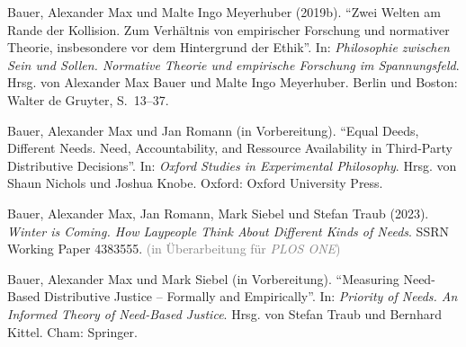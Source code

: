 \documentclass[justified,nobib,symmetric,twoside]{tufte-handout}
\begin{document}
\noindent\hangindent=0.4cm Bauer, Alexander Max und Malte Ingo Meyerhuber (2019b). \enquote{Zwei Welten am Rande der Kollision. Zum Verhältnis von empirischer Forschung und normativer Theorie, insbesondere vor dem Hintergrund der Ethik}. In: \textit{Philosophie zwischen Sein und Sollen. Normative Theorie und empirische Forschung im Spannungsfeld}. Hrsg. von Alexander Max Bauer und Malte Ingo Meyerhuber. Berlin und Boston: Walter de Gruyter, S.~13--37.

\noindent\hangindent=0.4cm Bauer, Alexander Max und Jan Romann (in Vorbereitung). \enquote{Equal Deeds, Different Needs. Need, Accountability, and Ressource Availability in Third-Party Distributive Decisions}. In: \textit{Oxford Studies in Experimental Philosophy}. Hrsg. von Shaun Nichols und Joshua Knobe. Oxford: Oxford University Press.

\noindent\hangindent=0.4cm Bauer, Alexander Max, Jan Romann, Mark Siebel und Stefan Traub (2023). \textit{Winter is Coming. How Laypeople Think About Different Kinds of Needs}. SSRN Working Paper 4383555. \textcolor{gray}{(in Überarbeitung für \textit{PLOS ONE})}

\noindent\hangindent=0.4cm Bauer, Alexander Max und Mark Siebel (in Vorbereitung). \enquote{Measuring Need-Based Distributive Justice -- Formally and Empirically}. In: \textit{Priority of Needs. An Informed Theory of Need-Based Justice}. Hrsg. von Stefan Traub und Bernhard Kittel. Cham: Springer.

\newpage\null\newpage
\newpage\null\newpage
\newpage\null\newpage\newpage\null\newpage
\newpage\null\newpage
\newpage\null\newpage
\newpage\null\newpage\newpage\null\newpage
\newpage\null\newpage\newpage\null\newpage



\newpage\null\newpage
\end{document}
